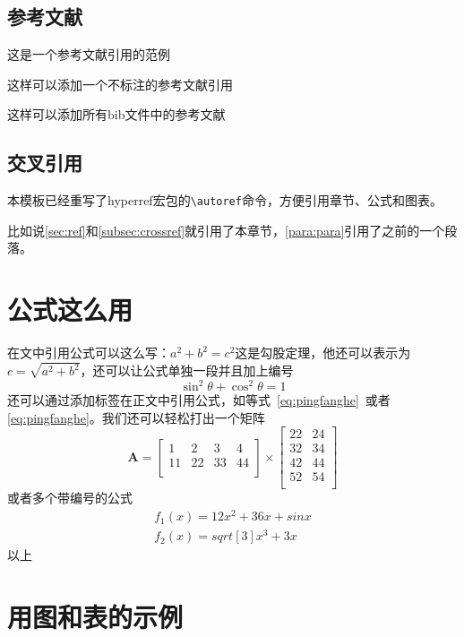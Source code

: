 \documentclass[supercite]{HustGraduPaper}
\begin{document}
	\subsection{参考文献}
	这是一个参考文献引用的范例\cite{Stone_1998}
	
	这样可以添加一个不标注的参考文献引用\nocite{9787508342894}
	
	这样可以添加所有bib文件中的参考文献\nocite{*}
	
	\subsection{交叉引用}\label{subsec:crossref}
	本模板已经重写了hyperref宏包的\verb|\autoref|命令，方便引用章节、公式和图表。
	
	比如说\autoref{sec:ref}和\autoref{subsec:crossref}就引用了本章节，\autoref{para:para}引用了之前的一个段落。
	
	
	
	\section{公式这么用}
	在文中引用公式可以这么写：$a^2+b^2=c^2$这是勾股定理，他还可以表示为$c=\sqrt{a^2+b^2}$，还可以让公式单独一段并且加上编号
	\begin{equation}
	\sin^2{\theta}+\cos^2{\theta}=1 \label{eq:pingfanghe}
	\end{equation}
	还可以通过添加标签在正文中引用公式，如等式~\eqref{eq:pingfanghe}~或者\autoref{eq:pingfanghe}。我们还可以轻松打出一个矩阵
	\begin{equation}
	\bm{A}=\begin{bmatrix}
	1&2&3&4\\
	11&22&33&44\\
	\end{bmatrix}
	\times\begin{bmatrix}
	22&24\\
	32&34\\
	42&44\\
	52&54\\
	\end{bmatrix}
	\end{equation}
	或者多个带编号的公式
	\begin{eqnarray}
	f_1(x)=12x^2+36x+sinx\\
	f_2(x)=sqrt[3]{x^3+3x}
	\end{eqnarray}
	以上
	
	\section{用图和表的示例}
\end{document}
